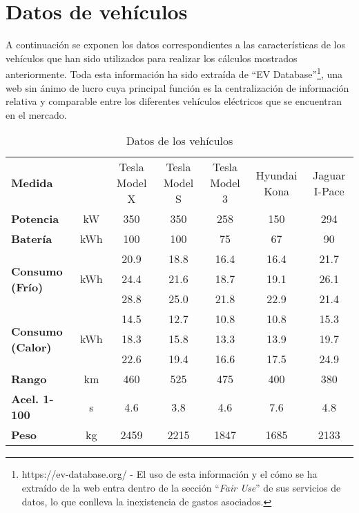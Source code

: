 \documentclass[11pt,spanish,listoffigures,listoftables]{tfgetsinf}
\begin{document}
\cleardoublepage

\APPENDIX

\chapter{Datos de vehículos}
A continuación se exponen los datos correspondientes a las características de los vehículos que han sido utilizados para realizar los cálculos mostrados anteriormente. Toda esta información ha sido extraída de ``EV Database''\footnote{https://ev-database.org/ - El uso de esta información y el cómo se ha extraído de la web entra dentro de la sección ``\textit{Fair Use}'' de sus servicios de datos, lo que conlleva la inexistencia de gastos asociados.}, una web sin ánimo de lucro cuya principal función es la centralización de información relativa y comparable entre los diferentes vehículos eléctricos que se encuentran en el mercado.

\begin{table}[h]
    \centering
    \begin{tabular}{m{}*{6}{c}}
    \toprule
    \multirow{2}{4em}{\textbf{Medida}} &  & \multirow{2}{4em}{\centering Tesla Model X} & \multirow{2}{4em}{\centering Tesla Model S} & \multirow{2}{4em}{\centering Tesla Model 3} & \multirow{2}{4em}{\centering Hyundai Kona} & \multirow{2}{4em}{\centering Jaguar I-Pace} \\
    \\
    \toprule
    \textbf{Potencia} & kW & 350 & 350 & 258 & 150 & 294 \\
    \textbf{Batería} & kWh & 100 & 100 & 75 & 67 & 90 \\
    \midrule
    \multirow{3}{4em}{\textbf{Consumo (Frío)}} & \multirow{3}{2em}{\centering kWh} & 20.9 & 18.8 & 16.4 & 16.4 & 21.7 \\
    & & 24.4 & 21.6 & 18.7 & 19.1 & 26.1 \\
    & & 28.8 & 25.0 & 21.8 & 22.9 & 21.4 \\
    \midrule
    \multirow{3}{4em}{\textbf{Consumo (Calor)}} & \multirow{3}{2em}{\centering kWh} & 14.5 & 12.7 & 10.8 & 10.8 & 15.3 \\
    & & 18.3 & 15.8 & 13.3 & 13.9 & 19.7 \\
    & & 22.6 & 19.4 & 16.6 & 17.5 & 24.9 \\
    \midrule
    \textbf{Rango} & km & 460 & 525 & 475 & 400 & 380 \\
    \textbf{Acel. 1-100} & s & 4.6 & 3.8 & 4.6 & 7.6 & 4.8 \\
    \textbf{Peso} & kg & 2459 & 2215 & 1847 & 1685 & 2133 \\
    \bottomrule
    \end{tabular}
    \caption{Datos de los vehículos}
    \label{tab:vehicle_data}
\end{table}
\end{document}
